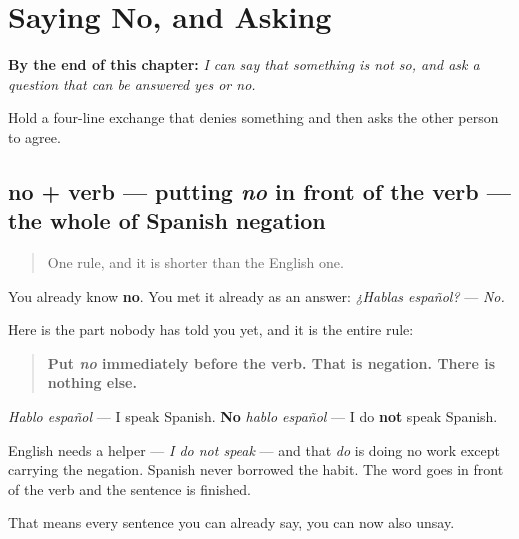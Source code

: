 
\chapter{Saying No, and Asking}
\label{ch:es-negate-and-ask}

\begin{chapteropening}
\textbf{By the end of this chapter:} \emph{I can say that something is not so, and ask a question that can be answered yes or no.}

Hold a four-line exchange that denies something and then asks the other person to agree.
\end{chapteropening}

\section[no + verb]{no + verb — putting \emph{no} in front of the verb — the whole of Spanish negation}

\label{lesson:ES-C267-no-verbo}



\begin{quote}
One rule, and it is shorter than the English one.
\end{quote}

\begin{grammarlens}[title={Grammar lens: putting \emph{no} in front of the verb — the whole of Spanish negation}]
You already know \textbf{no}. You met it already as an answer: \emph{¿Hablas español?} — \emph{No.}

Here is the part nobody has told you yet, and it is the entire rule:

\begin{quote}
\textbf{Put \emph{no} immediately before the verb. That is negation. There is nothing else.}
\end{quote}

\emph{Hablo español} — I speak Spanish. \textbf{No} \emph{hablo español} — I do \textbf{not} speak Spanish.

English needs a helper — \emph{I do not speak} — and that \emph{do} is doing no work except carrying the negation. Spanish never borrowed the habit. The word goes in front of the verb and the sentence is finished.

That means every sentence you can already say, you can now also unsay.
\end{grammarlens}

